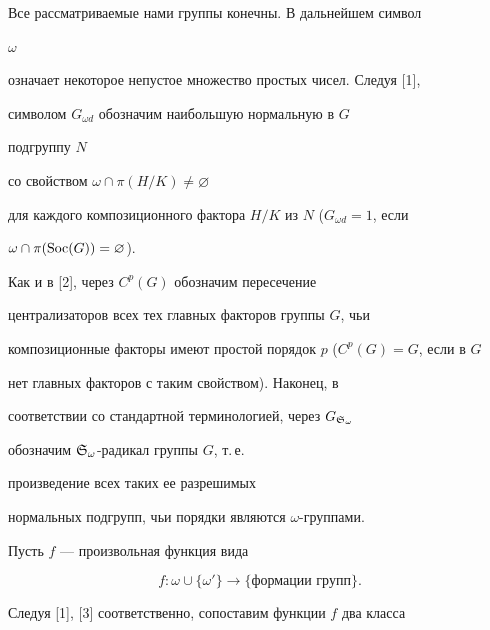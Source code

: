

\maketitle


\label{begin}











Все рассматриваемые нами группы конечны. В дальнейшем символ


$\omega$


означает некоторое непустое множество простых чисел. Следуя [1],


символом $G_{\omega d}$ обозначим наибольшую нормальную в $G$


подгруппу $N$


со свойством $\omega\cap\pi(H/K)\ne\varnothing$


для каждого композиционного фактора $H/K$ из $N$ ($G_{\omega d}=1$, если


$\omega\cap\pi(\operatorname{Soc}(G))=\varnothing$).


Как и в [2], через $C^p(G)$ обозначим пересечение


централизаторов всех тех главных факторов группы $G$, чьи


композиционные факторы имеют простой порядок $p$ ($C^p(G)=G$, если в $G$


нет главных факторов с таким свойством). Наконец, в


соответствии со стандартной терминологией, через $G_{\frak{S}_{\omega}}$


обозначим $\frak{S}_{\omega}$-радикал группы $G$, т.\,е.


произведение всех таких ее разрешимых


нормальных подгрупп, чьи порядки являются $\omega$-группами.





Пусть $f$ --- произвольная функция вида


\begin{equation}


f:\omega\cup\{\omega'\}\to\{\text{формации\ групп}\}.


\end{equation}


Следуя [1], [3] соответственно, сопоставим функции $f$ два класса


